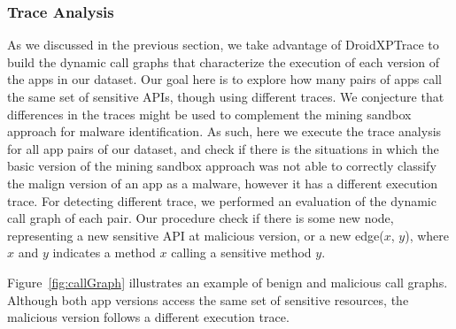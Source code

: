 
\subsubsection{Trace Analysis} \label{sec:pathsetup}


As we discussed in the previous section, we take advantage of DroidXPTrace to build the dynamic call graphs that characterize the execution of each version of the apps in our dataset. Our goal
here is to explore how many pairs of apps call the same set of sensitive APIs, though using different
traces. We conjecture that differences in the traces might be used to complement the mining sandbox
approach for malware identification. As such, here we execute the trace
analysis for all app pairs of our dataset, and check if there is the situations in which the basic version of the mining sandbox approach was not able to correctly classify the malign version of an app as a malware, however it has a different execution trace. For detecting different trace, we performed an evaluation of the dynamic call graph of each pair. Our procedure check if there is some new node, representing a new sensitive API at malicious version, or a new edge($x$, $y$), where $x$ and $y$ indicates a method $x$ calling a sensitive method $y$.

Figure~\ref{fig:callGraph} illustrates an example of benign and malicious call graphs.
Although both app versions access the same set of sensitive resources, the
malicious version follows a different execution trace. 


